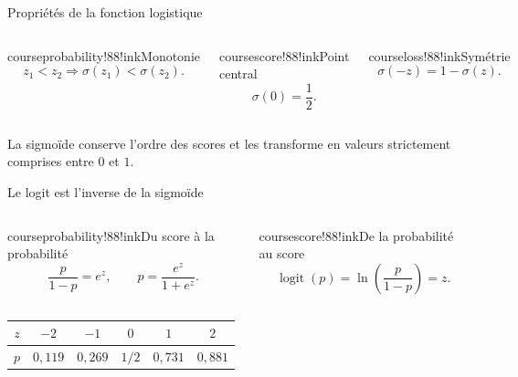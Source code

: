 \begin{frame}[t]{Propriétés de la fonction logistique}
  \vspace{4mm}
  \begin{columns}[T,onlytextwidth]
      \begin{coursecallout}{courseprobability!88!ink}{Monotonie}
        \[
          z_1<z_2\Rightarrow\sigma(z_1)<\sigma(z_2).
        \]
      \end{coursecallout}
      \begin{coursecallout}{coursescore!88!ink}{Point central}
        \[
          \sigma(0)=\frac12.
        \]
      \end{coursecallout}
      \begin{coursecallout}{courseloss!88!ink}{Symétrie}
        \[
          \sigma(-z)=1-\sigma(z).
        \]
      \end{coursecallout}
  \end{columns}
  \vfill
  \centering
  La sigmoïde conserve l'ordre des scores et les transforme en valeurs
  strictement comprises entre \(0\) et \(1\).
\end{frame}

\begin{frame}[t]{Le logit est l'inverse de la sigmoïde}
  \vspace{5mm}
  \begin{columns}[T,onlytextwidth]
      \begin{coursecallout}{courseprobability!88!ink}{Du score à la probabilité}
        \[
          \frac{p}{1-p}=e^z,
          \qquad p=\frac{e^z}{1+e^z}.
        \]
      \end{coursecallout}
      \begin{coursecallout}{coursescore!88!ink}{De la probabilité au score}
        \[
          \operatorname{logit}(p)
          =\ln\!\left(\frac{p}{1-p}\right)=z.
        \]
      \end{coursecallout}
  \end{columns}
  \vfill
  \centering
  \begin{tabular}{c|ccccc}
    $z$ & $-2$ & $-1$ & $0$ & $1$ & $2$\\
    \midrule
    $p$ & $0{,}119$ & $0{,}269$ & $1/2$ & $0{,}731$ & $0{,}881$
  \end{tabular}
\end{frame}

